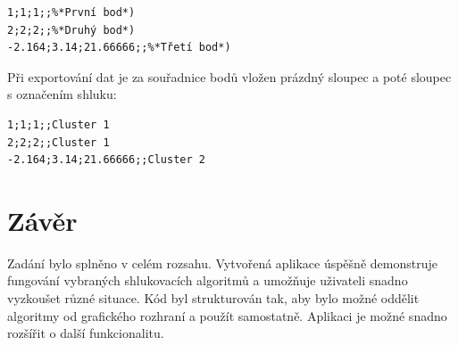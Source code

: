 \documentclass[pdftex,a4paper]{article}
\begin{document}
\begin{lstlisting}
1;1;1;;%*První bod*)
2;2;2;;%*Druhý bod*)
-2.164;3.14;21.66666;;%*Třetí bod*)
\end{lstlisting}


Při exportování dat je za souřadnice bodů vložen prázdný sloupec a poté sloupec s označením shluku:

\begin{lstlisting}
1;1;1;;Cluster 1
2;2;2;;Cluster 1
-2.164;3.14;21.66666;;Cluster 2
\end{lstlisting}



\section{Závěr}

Zadání bylo splněno v celém rozsahu. Vytvořená aplikace úspěšně demonstruje fungování vybraných shlukovacích algoritmů a umožňuje uživateli snadno vyzkoušet různé situace. Kód byl strukturován tak, aby bylo možné oddělit algoritmy od grafického rozhraní a použít samostatně. Aplikaci je možné snadno rozšířit o další funkcionalitu.
\end{document}
